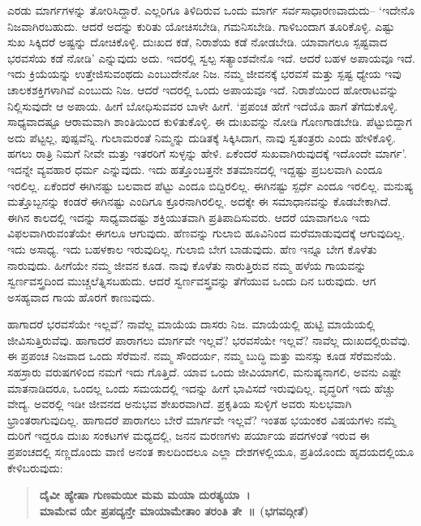\vskip 0.3cm

ಎರಡು ಮಾರ್ಗಗಳನ್ನು ತೋರಿಸಿದ್ದಾರೆ. ಎಲ್ಲರಿಗೂ ತಿಳಿದಿರುವ ಒಂದು ಮಾರ್ಗ ಸರ್ವಸಾಧಾರಣವಾದುದು– ‘ಇದೇನೊ ನಿಜವಾಗಿರಬಹುದು. ಆದರೆ ಅದನ್ನು ಕುರಿತು ಯೋಚಿಸಬೇಡಿ, ಗಮನಿಸಬೇಡಿ. ಗಾಳಿಬಂದಾಗ ತೂರಿಕೊಳ್ಳಿ. ಎಷ್ಟು ಸುಖ ಸಿಕ್ಕಿದರೆ ಅಷ್ಟನ್ನು ದೋಚಿಕೊಳ್ಳಿ. ದುಃಖದ ಕಡೆ, ನಿರಾಶೆಯ ಕಡೆ ನೋಡಬೇಡಿ. ಯಾವಾಗಲೂ ಸ್ಪಷ್ಟವಾದ ಭರವಸೆಯ ಕಡೆ ನೋಡಿ’ ಎನ್ನುವುದು ಅದು. ಇದರಲ್ಲಿ ಸ್ವಲ್ಪ ಸತ್ಯಾಂಶವೇನೊ ಇದೆ. ಆದರೆ ಬಹಳ ಅಪಾಯವೂ ಇದೆ. ಇದು ಕ್ರಿಯೆಯನ್ನು ಉತ್ತೇಜಿಸುವಂಥದು ಎಂಬುದೇನೋ ನಿಜ. ನಮ್ಮ ಜೀವನಕ್ಕೆ ಭರವಸೆ ಮತ್ತು ಸ್ಪಷ್ಟ ಧ್ಯೇಯ ಇವು ಚಾಲಕಶಕ್ತಿಗಳಾಗಿವೆ ಎಂಬುದು ನಿಜ. ಆದರೆ ಇದರಲ್ಲಿ ಒಂದು ಅಪಾಯವೂ ಇದೆ. ನಿರಾಶೆಯಿಂದ ಹೋರಾಟವನ್ನು ನಿಲ್ಲಿಸುವುದೇ ಆ ಅಪಾಯ. ಹೀಗೆ ಬೋಧಿಸುವವರ ಬಾಳೇ ಹೀಗೆ. ‘ಪ್ರಪಂಚ ಹೇಗೆ ಇದೆಯೊ ಹಾಗೆ ತೆಗೆದುಕೊಳ್ಳಿ. ಸಾಧ್ಯವಾದಷ್ಟೂ ಆರಾಮವಾಗಿ ಶಾಂತಿಯಿಂದ ಕುಳಿತುಕೊಳ್ಳಿ. ಈ ದುಃಖವನ್ನು ನೋಡಿ ಗೊಣಗಾಡಬೇಡಿ. ಪೆಟ್ಟುಬಿದ್ದಾಗ ಅದು ಪೆಟ್ಟಲ್ಲ, ಪುಷ್ಪವೆನ್ನಿ. ಗುಲಾಮರಂತೆ ನಿಮ್ಮನ್ನು ದುಡಿತಕ್ಕೆ ಸಿಕ್ಕಿಸಿದಾಗ, ನಾವು ಸ್ವತಂತ್ರರು ಎಂದು ಹೇಳಿಕೊಳ್ಳಿ. ಹಗಲು ರಾತ್ರಿ ನಿಮಗೆ ನೀವೇ ಮತ್ತು ಇತರರಿಗೆ ಸುಳ್ಳನ್ನು ಹೇಳಿ. ಏಕೆಂದರೆ ಸುಖವಾಗಿರುವುದಕ್ಕೆ ಇದೊಂದೇ ಮಾರ್ಗ’. ಇದನ್ನೇ ವ್ಯವಹಾರ ಧರ್ಮ ಎನ್ನುವುದು. ಇದು ಹತ್ತೊಂಬತ್ತನೇ ಶತಮಾನದಲ್ಲಿ ಇದ್ದಷ್ಟು ಪ್ರಬಲವಾಗಿ ಎಂದೂ ಇರಲಿಲ್ಲ. ಏಕೆಂದರೆ ಈಗಿನಷ್ಟು ಬಲವಾದ ಪೆಟ್ಟು ಎಂದೂ ಬಿದ್ದಿರಲಿಲ್ಲ. ಈಗಿನಷ್ಟು ಸ್ಪರ್ಧೆ ಎಂದೂ ಇರಲಿಲ್ಲ. ಮನುಷ್ಯ ಮತ್ತೊಬ್ಬನನ್ನು ಕಂಡರೆ ಈಗಿನಷ್ಟು ಎಂದಿಗೂ ಕ್ರೂರನಾಗಿರಲಿಲ್ಲ. ಅದಕ್ಕೇ ಈ ಸಮಾಧಾನವನ್ನು ಕೊಡಬೇಕಾಗಿದೆ. ಈಗಿನ ಕಾಲದಲ್ಲಿ ಇದನ್ನು ಸಾಧ್ಯವಾದಷ್ಟು ಶಕ್ತಿಯುತವಾಗಿ ಪ್ರತಿಪಾದಿಸುವರು. ಆದರೆ ಯಾವಾಗಲೂ ಇದು ವಿಫಲವಾಗಿರುವಂತೆಯೇ ಈಗಲೂ ಆಗುವುದು. ಹೆಣವನ್ನು ಗುಲಾಬಿ ಹೂವಿನಿಂದ ಮರೆಮಾಡುವುದಕ್ಕೆ ಆಗುವುದಿಲ್ಲ. ಇದು ಅಸಾಧ್ಯ. ಇದು ಬಹಳಕಾಲ ಇರುವುದಿಲ್ಲ. ಗುಲಾಬಿ ಬೇಗ ಬಾಡುವುದು. ಹೆಣ ಇನ್ನೂ ಬೇಗ ಕೊಳೆತು ನಾರುವುದು. ಹೀಗೆಯೇ ನಮ್ಮ ಜೀವನ ಕೂಡ. ನಾವು ಕೊಳೆತು ನಾರುತ್ತಿರುವ ನಮ್ಮ ಹಳೆಯ ಗಾಯವನ್ನು ಸ್ವರ್ಣವಸ್ತ್ರದಿಂದ ಮುಚ್ಚಲೆತ್ನಿಸಬಹುದು. ಆದರೆ ಸ್ವರ್ಣವಸ್ತ್ರವನ್ನು ತೆಗೆಯುವ ಒಂದು ದಿನ ಬರುವುದು. ಆಗ ಅಸಹ್ಯವಾದ ಗಾಯ ಹೊರಗೆ ಕಾಣುವುದು.

\vskip 0.2cm

ಹಾಗಾದರೆ ಭರವಸೆಯೇ ಇಲ್ಲವೆ? ನಾವೆಲ್ಲ ಮಾಯೆಯ ದಾಸರು ನಿಜ. ಮಾಯೆಯಲ್ಲಿ ಹುಟ್ಟಿ ಮಾಯೆಯಲ್ಲಿ ಜೀವಿಸುತ್ತಿರುವೆವು. ಹಾಗಾದರೆ ಪಾರಾಗಲು ಮಾರ್ಗವೇ ಇಲ್ಲವೆ? ಭರವಸೆಯೇ ಇಲ್ಲವೆ? ನಾವೆಲ್ಲ ದುಃಖದಲ್ಲಿರುವೆವು. ಈ ಪ್ರಪಂಚ ನಿಜವಾದ ಒಂದು ಸೆರೆಮನೆ. ನಮ್ಮ ಸೌಂದರ್ಯ, ನಮ್ಮ ಬುದ್ಧಿ ಮತ್ತು ಮನಸ್ಸು ಕೂಡ ಸೆರೆಮನೆಯೆ. ಸಹಸ್ರಾರು ವರುಷಗಳಿಂದ ನಮಗೆ ಇದು ಗೊತ್ತಿದೆ. ಯಾವ ಒಂದು ಜೀವಿಯಾಗಲಿ, ಮನುಷ್ಯನಾಗಲಿ, ಅವನು ಎಷ್ಟೇ ಮಾತನಾಡಿದರೂ, ಒಂದಲ್ಲ ಒಂದು ಸಮಯದಲ್ಲಿ ಇದನ್ನು ಹೀಗೆ ಭಾವಿಸದೆ ಇರುವುದಿಲ್ಲ. ವೃದ್ಧರಿಗೆ ಇದು ಹೆಚ್ಚು ವೇದ್ಯ. ಅವರಲ್ಲಿ ಇಡೀ ಜೀವನದ ಅನುಭವ ಶೇಖರವಾಗಿದೆ. ಪ್ರಕೃತಿಯ ಸುಳ್ಳಿಗೆ ಅವರು ಸುಲಭವಾಗಿ ಭ್ರಾಂತರಾಗುವುದಿಲ್ಲ. ಹಾಗಾದರೆ ಪಾರಾಗಲು ಬೇರೆ ಮಾರ್ಗವೇ ಇಲ್ಲವೆ? ಇಂತಹ ಭಯಂಕರ ವಿಷಯಗಳು ನಮ್ಮೆ ದುರಿಗೆ ಇದ್ದರೂ ದುಃಖ ಸಂಕಟಗಳ ಮಧ್ಯದಲ್ಲಿ, ಜನನ ಮರಣಗಳು ಪರ್ಯಾಯ ಪದಗಳಂತೆ ಇರುವ ಈ ಪ್ರಪಂಚದಲ್ಲಿ ಸಣ್ಣದೊಂದು ವಾಣಿ ಅನಂತ ಕಾಲದಿಂದಲೂ ಎಲ್ಲಾ ದೇಶಗಳಲ್ಲಿಯೂ, ಪ್ರತಿಯೊಂದು ಹೃದಯದಲ್ಲಿಯೂ ಕೇಳಿಬರುವುದು:

\begin{verse}
\textbf{ದೈವೀ ಹ್ಯೇಷಾ ಗುಣಮಯೀ ಮಮ ಮಯಾ ದುರತ್ಯಯಾ~।\\ಮಾಮೇವ ಯೇ ಪ್ರಪದ್ಯನ್ತೇ ಮಾಯಾಮೇತಾಂ ತರಂತಿ ತೇ~॥ (ಭಗವದ್ಗೀತೆ)}
\end{verse}

